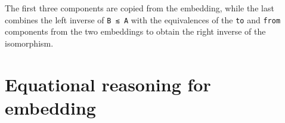 \begin{fence}
\begin{code}
%
\>[4]\AgdaSymbol{;}%
\>[788I]\AgdaSpace{}%
\AgdaSymbol{=}\AgdaSpace{}%
\AgdaSpace{}%
\<%
\\
\>[788I][@{}l@{\AgdaIndent{0}}]%
\>[8]\<%
\\
\>[8][@{}l@{\AgdaIndent{0}}]%
\>[10]\AgdaSpace{}%
\AgdaSpace{}%
\AgdaSymbol{(}\AgdaSpace{}%
\AgdaSpace{}%
\AgdaSymbol{)}\<%
\\
%
\>[8]\AgdaSpace{}%
\AgdaSpace{}%
\AgdaSymbol{(}\AgdaSpace{}%
\AgdaSymbol{)}\AgdaSpace{}%
\AgdaSymbol{(}\AgdaSpace{}%
\AgdaSpace{}%
\AgdaSymbol{)}\AgdaSpace{}%
\<%
\\
\>[8][@{}l@{\AgdaIndent{0}}]%
\>[10]\AgdaSpace{}%
\AgdaSpace{}%
\AgdaSymbol{(}\AgdaSpace{}%
\AgdaSpace{}%
\AgdaSymbol{)}\<%
\\
%
\>[8]\AgdaSpace{}%
\AgdaSpace{}%
\AgdaSpace{}%
\AgdaSymbol{(}\AgdaSpace{}%
\AgdaSpace{}%
\AgdaSymbol{)}\AgdaSpace{}%
\<%
\\
\>[8][@{}l@{\AgdaIndent{0}}]%
\>[10]\AgdaSpace{}%
\AgdaSpace{}%
\AgdaSymbol{(}\AgdaSpace{}%
\AgdaSpace{}%
\AgdaSymbol{)}\<%
\\
%
\>[8]\AgdaSpace{}%
\AgdaSpace{}%
\AgdaSpace{}%
\AgdaSpace{}%
\<%
\\
\>[8][@{}l@{\AgdaIndent{0}}]%
\>[10]\<%
\\
%
\>[8]\AgdaSymbol{\}}\<%
\\
%
\>[4]\AgdaSymbol{\}}\<%
\end{code}
\end{fence}

The first three components are copied from the embedding, while the last
combines the left inverse of \texttt{B\ ≲\ A} with the equivalences of
the \texttt{to} and \texttt{from} components from the two embeddings to
obtain the right inverse of the isomorphism.

\hypertarget{equational-reasoning-for-embedding}{%
\section{Equational reasoning for
embedding}\label{equational-reasoning-for-embedding}}

